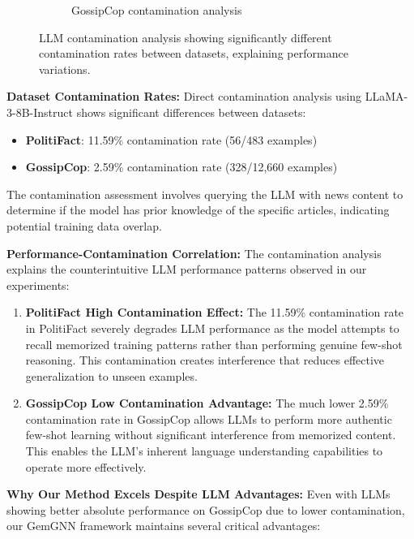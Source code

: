 \begin{figure}[htbp]
\begin{subfigure}[b]{0.48\textwidth}
    \caption{GossipCop contamination analysis}
    \label{fig:gossipcop_contamination}
\end{subfigure}
\caption{LLM contamination analysis showing significantly different contamination rates between datasets, explaining performance variations.}
\label{fig:contamination_analysis}
\end{figure}

\textbf{Dataset Contamination Rates:} Direct contamination analysis using LLaMA-3-8B-Instruct shows significant differences between datasets:
\begin{itemize}
    \item \textbf{PolitiFact}: 11.59\% contamination rate (56/483 examples)
    \item \textbf{GossipCop}: 2.59\% contamination rate (328/12,660 examples)
\end{itemize}

The contamination assessment involves querying the LLM with news content to determine if the model has prior knowledge of the specific articles, indicating potential training data overlap.

\textbf{Performance-Contamination Correlation:} The contamination analysis explains the counterintuitive LLM performance patterns observed in our experiments:

\begin{enumerate}
    \item \textbf{PolitiFact High Contamination Effect:} The 11.59\% contamination rate in PolitiFact severely degrades LLM performance as the model attempts to recall memorized training patterns rather than performing genuine few-shot reasoning. This contamination creates interference that reduces effective generalization to unseen examples.
    
    \item \textbf{GossipCop Low Contamination Advantage:} The much lower 2.59\% contamination rate in GossipCop allows LLMs to perform more authentic few-shot learning without significant interference from memorized content. This enables the LLM's inherent language understanding capabilities to operate more effectively.
\end{enumerate}

\textbf{Why Our Method Excels Despite LLM Advantages:} Even with LLMs showing better absolute performance on GossipCop due to lower contamination, our GemGNN framework maintains several critical advantages:

